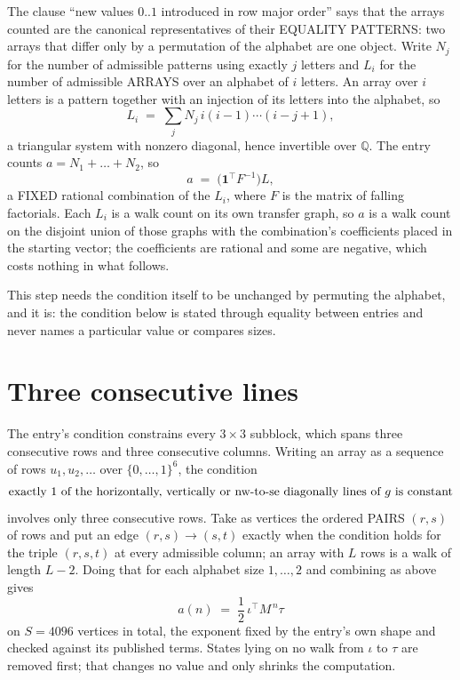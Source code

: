 \documentclass[11pt,a4paper]{article}
\theoremstyle{plain}
\theoremstyle{definition}
\begin{document}
The clause ``new values $0..1$ introduced in row major order'' says that the arrays
counted are the canonical representatives of their EQUALITY PATTERNS: two arrays that differ
only by a permutation of the alphabet are one object. Write $N_j$ for the number of admissible
patterns using exactly $j$ letters and $L_i$ for the number of admissible ARRAYS over an
alphabet of $i$ letters. An array over $i$ letters is a pattern together with an injection of
its letters into the alphabet, so
\[
L_i\;=\;\sum_{j}N_j\,i(i-1)\cdots(i-j+1),
\]
a triangular system with nonzero diagonal, hence invertible over $\mathbb{Q}$. The entry
counts $a=N_1+\dots+N_{2}$, so
\[
a\;=\;\bigl(\mathbf{1}^{\!\top}F^{-1}\bigr)L ,
\]
a FIXED rational combination of the $L_i$, where $F$ is the matrix of falling factorials.
Each $L_i$ is a walk count on its own transfer graph, so $a$ is a walk count on the disjoint
union of those graphs with the combination's coefficients placed in the starting vector; the
coefficients are rational and some are negative, which costs nothing in what follows.

This step needs the condition itself to be unchanged by permuting the alphabet, and it is:
the condition below is stated through equality between entries and never names a particular
value or compares sizes.

\section{Three consecutive lines}

The entry's condition constrains every $3\times3$ subblock, which spans three consecutive
rows and three consecutive columns. Writing an array as a sequence of rows
$u_1,u_2,\dots$ over $\{0,\dots,1\}^{6}$, the condition
\[
\text{exactly }1\text{ of the horizontally, vertically or nw-to-se diagonally lines of }g\text{ \text{is constant}}
\]
involves only three consecutive rows. Take as vertices the ordered PAIRS $(r,s)$ of
rows and put an edge $(r,s)\to(s,t)$ exactly when the condition holds for the triple
$(r,s,t)$ at every admissible column; an array with $L$ rows is a walk of length $L-2$.
Doing that for each alphabet size $1,\dots,2$ and combining as above gives
\[
a(n)\;=\;\frac{1}{2}\,\iota^{\!\top}M^{\,n}\tau
\]
on $S=4096$ vertices in total, the exponent fixed by the entry's own shape and checked against
its published terms. States lying on no walk from $\iota$ to $\tau$ are removed first; that
changes no value and only shrinks the computation.
\end{document}
